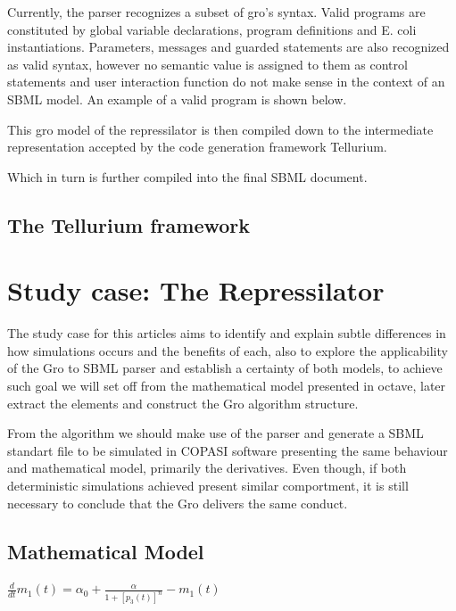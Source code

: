 \documentclass[12pt]{article}
\begin{document}
    
    Currently, the parser recognizes a subset of gro's syntax. Valid programs are constituted by global variable declarations, program definitions and E. coli instantiations. Parameters, messages and guarded statements are also recognized as valid syntax, however no semantic value is assigned to them as control statements and user interaction function do not make sense in the context of an SBML model. An example of a valid program is shown below.
    
    This gro model of the repressilator is then compiled down to the intermediate representation accepted by the code generation framework Tellurium.
    
    Which in turn is further compiled into the final SBML document.
    
    
\subsection{The Tellurium framework}
    \lipsum[1]

\section{Study case: The Repressilator}

The study case for this articles aims to identify and explain subtle differences in how simulations occurs and the benefits of each, also to explore the applicability of the Gro to SBML parser and establish a certainty of both models, to achieve such goal we will set off from the mathematical model presented in octave, later extract the elements and construct the Gro algorithm structure. 

From the algorithm we should make use of the parser and generate a SBML standart file to be simulated in COPASI software presenting the same behaviour and mathematical model, primarily the derivatives. Even though, if both deterministic simulations achieved present similar comportment, it is still necessary to conclude that the Gro delivers the same conduct.

\subsection{Mathematical Model}



$\frac{d}{dt}m_{1}(t) = \alpha_{0} + \frac{\alpha}{1 + [p_{3}(t)]^{n}} - m_{1}(t)$
\end{document}
